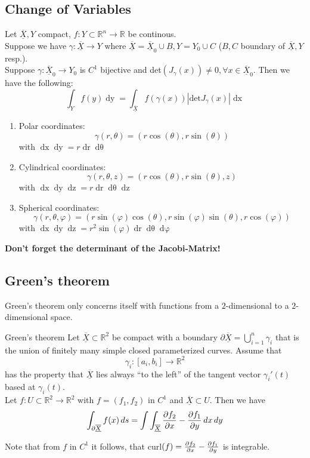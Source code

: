 \documentclass[a4paper,fontsize = 10pt]{article}
\def\R{\mathbb{R}}
\def\X{\underline{\overline{X}}}
\begin{document}
\subsection{Change of Variables}
Let $\X, Y$ compact, $f: Y \subset \R^n \to \R$ be continous. 
\\Suppose we have $\gamma: \X \to Y$ where $\X = \X_0 \cup B, Y = Y_0 \cup C$ ($B,C$ boundary of $\X,Y$ resp.).
\\Suppose $\gamma: \X_0 \to Y_0$ is $C^1$ bijective and det$(J_\gamma(x)) \neq 0, \forall x \in \X_0$.
Then we have the following:
\[\int_Yf(y)\mathop{dy} = \int_{\X}f(\gamma(x))|\text{det}J_{\gamma}(x)|\mathop{dx}\]

\begin{enumerate}
  \item Polar coordinates: \[\gamma(r, \theta) = (r \cos(\theta), r \sin(\theta))\] with \(\mathop{dx}\mathop{dy} = r \mathop{dr} \mathop{d\theta}\)
  \item Cylindrical coordinates: \[\gamma(r, \theta, z) = (r \cos(\theta), r \sin(\theta), z)\] with \(\mathop{dx} \mathop{dy} \mathop{dz} = r \mathop{dr} \mathop{d\theta} \mathop{dz}\)
  \item Spherical coordinates: \[\gamma(r, \theta, \varphi) = (r\sin(\varphi)\cos(\theta), r \sin(\varphi)\sin(\theta), r \cos(\varphi))\] with \(\mathop{dx}\mathop{dy}\mathop{dz} = r^2 \sin(\varphi) \mathop{dr} \mathop{d\theta} \mathop{d\varphi}\)
\end{enumerate}

\textbf{Don't forget the determinant of the Jacobi-Matrix!}

\subsection{Green's theorem}
Green's theorem only concerns itself with functions from a $2$-dimensional to a $2$-dimensional space. 

\begin{mainbox}{Green's theorem}
  Let $\X \subset \R^2$ be compact with a boundary $\partial \X = \bigcup_{i = 1}^{n}\gamma_i$ that is the union of finitely many simple closed parameterized curves. Assume that 
  \[\gamma_i: [a_i,b_i] \to \R^2\]
  has the property that $\X$ lies always ``to the left'' of the tangent vector $\gamma_i'(t)$ based at $\gamma_i(t)$. 
  \\Let $f: U \subset \R^2 \to \R^2$ with $f = (f_1, f_2)$ in $C^1$ and $\X \subset U$. Then we have
  \[\int_{\partial\X}f(x)\mathop{ds} = \int \int_{\X} \pdv{f_2}{x}-\pdv{f_1}{y} \mathop{dx}\mathop{dy}\]
\end{mainbox}
Note that from $f$ in $C^1$ it follows, that curl$(f) = \pdv{f_2}{x}-\pdv{f_1}{y}$ is integrable.
\end{document}
